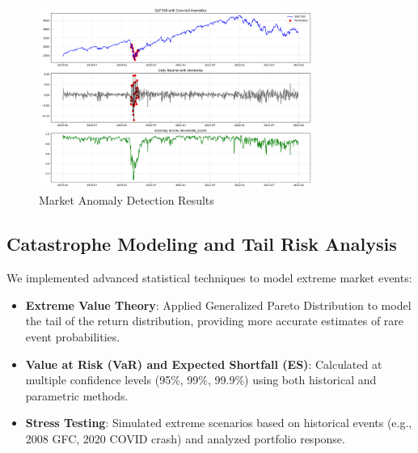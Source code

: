 \documentclass[13pt]{article}
\begin{document}
\begin{figure}[htbp]
	\centering
	\includegraphics[width=0.8\textwidth]{../results/anomalies/anomalies_visualization.png}
	\caption{Market Anomaly Detection Results}
	\label{fig:anomalies}
\end{figure}

\subsection{Catastrophe Modeling and Tail Risk Analysis}
We implemented advanced statistical techniques to model extreme market events:

\begin{itemize}
	\item \textbf{Extreme Value Theory}: Applied Generalized Pareto Distribution to model the tail of the return distribution, providing more accurate estimates of rare event probabilities.

	\item \textbf{Value at Risk (VaR) and Expected Shortfall (ES)}: Calculated at multiple confidence levels (95\%, 99\%, 99.9\%) using both historical and parametric methods.

	\item \textbf{Stress Testing}: Simulated extreme scenarios based on historical events (e.g., 2008 GFC, 2020 COVID crash) and analyzed portfolio response.
\end{itemize}
\end{document}
